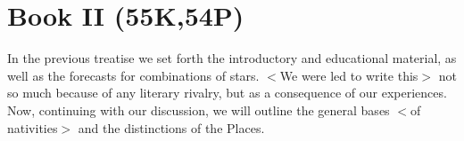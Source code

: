 \chapter{Book II (55K,54P)}

In the previous treatise we set forth the introductory and educational material, as well as the forecasts for combinations of stars. $<$We were led to write this$>$ not so much because of any literary rivalry, but as a consequence of our experiences. Now, continuing with our discussion, we will outline the general bases $<$of nativities$>$ and the distinctions of the Places.




\newpage
